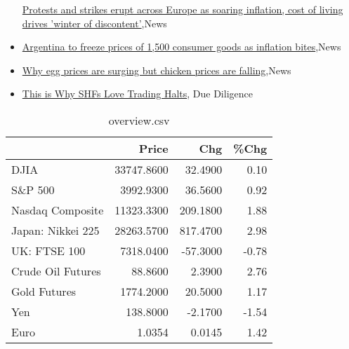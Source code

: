 \documentclass{article}%
\begin{document}
\begin{itemize}
\href{https://reddit.com/r/Economics/comments/ysigqr/protests\_and\_strikes\_erupt\_across\_europe\_as/}{Protests and strikes erupt across Europe as soaring inflation, cost of living drives 'winter of discontent'},News%
\item%
\href{https://reddit.com/r/Economics/comments/yshyfq/argentina\_to\_freeze\_prices\_of\_1500\_consumer\_goods/}{Argentina to freeze prices of 1,500 consumer goods as inflation bites},News%
\item%
\href{https://reddit.com/r/Economics/comments/ysgoqa/why\_egg\_prices\_are\_surging\_but\_chicken\_prices\_are/}{Why egg prices are surging  but chicken prices are falling},News%
\item%
\href{https://reddit.com/r/Superstonk/comments/yt5zfb/this\_is\_why\_shfs\_love\_trading\_halts/}{This is Why SHFs Love Trading Halts}, Due Diligence%
\end{itemize}%


\begin{table}[htbp]%
\caption{overview.csv}%
\centering%
\begin{adjustbox}{width=1\textwidth}%
\begin{tabular}{lrrr}
\toprule
                  &      Price &      Chg &  \%Chg \\
\midrule
             DJIA & 33747.8600 &  32.4900 &  0.10 \\
          S\&P 500 &  3992.9300 &  36.5600 &  0.92 \\
 Nasdaq Composite & 11323.3300 & 209.1800 &  1.88 \\
Japan: Nikkei 225 & 28263.5700 & 817.4700 &  2.98 \\
     UK: FTSE 100 &  7318.0400 & -57.3000 & -0.78 \\
Crude Oil Futures &    88.8600 &   2.3900 &  2.76 \\
     Gold Futures &  1774.2000 &  20.5000 &  1.17 \\
              Yen &   138.8000 &  -2.1700 & -1.54 \\
             Euro &     1.0354 &   0.0145 &  1.42 \\
\bottomrule
\end{tabular}
%
\end{adjustbox}%
\end{table}

%
\end{document}
